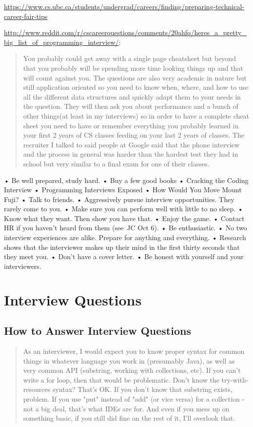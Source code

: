\url{https://www.cs.ubc.ca/students/undergrad/careers/finding/preparing-technical-career-fair-tips}

\url{http://www.reddit.com/r/cscareerquestions/comments/20ahfq/heres_a_pretty_big_list_of_programming_interview/}:
\blockquote{You probably could get away with a single page cheatsheet but beyond that you probably will be spending more time looking things up and that will count against you. The questions are also very academic in nature but still application oriented so you need to know when, where, and how to use all the different data structures and quickly adapt them to your needs in the question. They will then ask you about performance and a bunch of other things(at least in my interviews) so in order to have a complete cheat sheet you need to have or remember everything you probably learned in your first 2 years of CS classes feeding on your last 2 years of classes. The recruiter I talked to said people at Google said that the phone interview and the process in general was harder than the hardest test they had in school but very similar to a final exam for one of their classes.
}


• Be well prepared, study hard.
• Buy a few good books
• Cracking the Coding Interview
• Programming Interviews Exposed
• How Would You Move Mount Fuji?
• Talk to friends.
• Aggressively pursue interview opportunities. They rarely come to you.
• Make sure you can perform well with little to no sleep.
• Know what they want. Then show you have that.
• Enjoy the game.
• Contact HR if you haven’t heard from them (see JC Oct 6).
• Be enthusiastic.
• No two interview experiences are alike. Prepare for anything and everything.
• Research shows that the interviewer makes up their mind in the first thirty seconds that they meet you.
• Don’t have a cover letter.
• Be honest with yourself and your interviewers.



\section{Interview Questions}
\subsection{How to Answer Interview Questions}
\blockquote{As an interviewer, I would expect you to know proper syntax for
common things in whatever language you work in (presumably Java), as well as
very common API (substring, working with collections, etc). If you can't write a
for loop, then that would be problematic. Don't know the try-with-resources
syntax? That's OK. If you don't know that substring exists, problem. If you use
"put" instead of "add" (or vice versa) for a collection - not a big deal, that's
what IDEs are for. And even if you mess up on something basic, if you still did
fine on the rest of it, I'll overlook that.}

